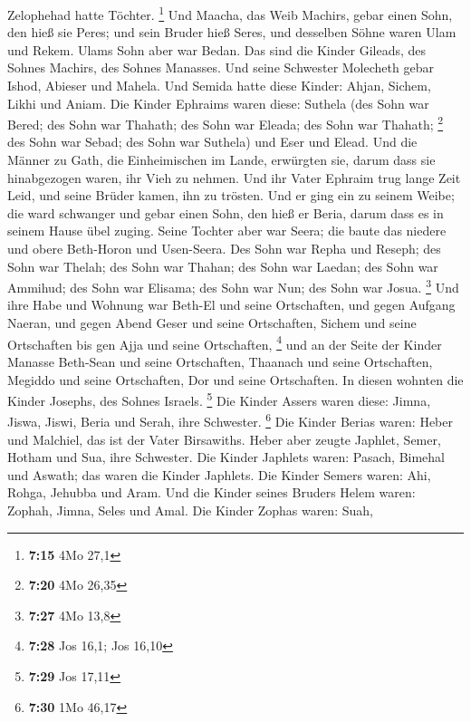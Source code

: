 Zelophehad hatte Töchter. \footnote{\textbf{7:15} 4Mo 27,1}
 Und Maacha, das Weib Machirs, gebar einen Sohn, den hieß
sie Peres; und sein Bruder hieß Seres, und desselben Söhne waren Ulam
und Rekem.  Ulams Sohn aber war Bedan. Das sind die
Kinder Gileads, des Sohnes Machirs, des Sohnes Manasses. 
Und seine Schwester Molecheth gebar Ishod, Abieser und Mahela.
 Und Semida hatte diese Kinder: Ahjan, Sichem, Likhi und
Aniam.  Die Kinder Ephraims waren diese: Suthela (des
Sohn war Bered; des Sohn war Thahath; des Sohn war Eleada; des Sohn war
Thahath; \footnote{\textbf{7:20} 4Mo 26,35}  des Sohn war
Sebad; des Sohn war Suthela) und Eser und Elead. Und die Männer zu Gath,
die Einheimischen im Lande, erwürgten sie, darum dass sie hinabgezogen
waren, ihr Vieh zu nehmen.  Und ihr Vater Ephraim trug
lange Zeit Leid, und seine Brüder kamen, ihn zu trösten. 
Und er ging ein zu seinem Weibe; die ward schwanger und gebar einen
Sohn, den hieß er Beria, darum dass es in seinem Hause übel zuging.
 Seine Tochter aber war Seera; die baute das niedere und
obere Beth-Horon und Usen-Seera.  Des Sohn war Repha und
Reseph; des Sohn war Thelah; des Sohn war Thahan;  des
Sohn war Laedan; des Sohn war Ammihud; des Sohn war Elisama;
 des Sohn war Nun; des Sohn war Josua. \footnote{\textbf{7:27}
  4Mo 13,8}  Und ihre Habe und Wohnung war Beth-El und
seine Ortschaften, und gegen Aufgang Naeran, und gegen Abend Geser und
seine Ortschaften, Sichem und seine Ortschaften bis gen Ajja und seine
Ortschaften, \footnote{\textbf{7:28} Jos 16,1; Jos 16,10}
 und an der Seite der Kinder Manasse Beth-Sean und seine
Ortschaften, Thaanach und seine Ortschaften, Megiddo und seine
Ortschaften, Dor und seine Ortschaften. In diesen wohnten die Kinder
Josephs, des Sohnes Israels. \footnote{\textbf{7:29} Jos 17,11}
 Die Kinder Assers waren diese: Jimna, Jiswa, Jiswi,
Beria und Serah, ihre Schwester. \footnote{\textbf{7:30} 1Mo 46,17}
 Die Kinder Berias waren: Heber und Malchiel, das ist der
Vater Birsawiths.  Heber aber zeugte Japhlet, Semer,
Hotham und Sua, ihre Schwester.  Die Kinder Japhlets
waren: Pasach, Bimehal und Aswath; das waren die Kinder Japhlets.
 Die Kinder Semers waren: Ahi, Rohga, Jehubba und Aram.
 Und die Kinder seines Bruders Helem waren: Zophah,
Jimna, Seles und Amal.  Die Kinder Zophas waren: Suah,
